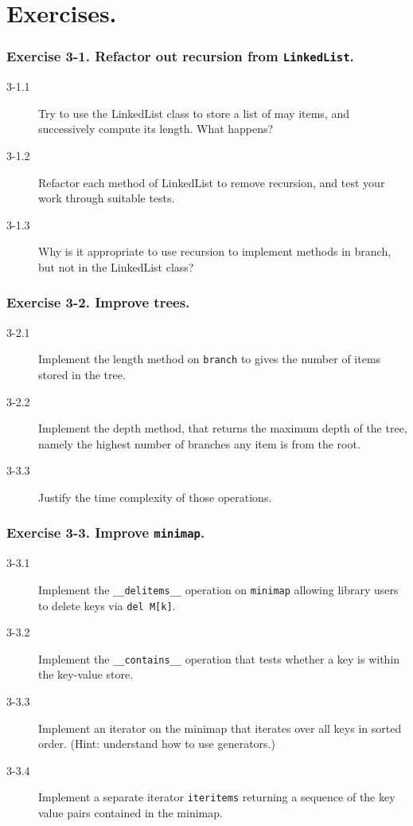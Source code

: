 \documentclass{beamer} %
\begin{document}
\section{Exercises.}

\begin{frame}

\frametitle{Exercise 3-1. Refactor out recursion from \texttt{LinkedList}.}

\begin{description}
  \item[3-1.1] Try to use the LinkedList class to store a list of may items, and successively compute its length. What happens?
  \item[3-1.2] Refactor each method of LinkedList to remove recursion, and test your work through suitable tests.
  \item[3-1.3] Why is it appropriate to use recursion to implement methods in branch, but not in the LinkedList class?
\end{description}

\end{frame}


\begin{frame}

\frametitle{Exercise 3-2. Improve trees.}

\begin{description}
  \item[3-2.1] Implement the length method on \texttt{branch} to gives the number of items stored in the tree.
  \item[3-2.2] Implement the depth method, that returns the maximum depth of the tree, namely the highest number of branches any item is from the root.
  \item[3-3.3] Justify the time complexity of those operations.
\end{description}


\end{frame}

\begin{frame}

\frametitle{Exercise 3-3. Improve \texttt{minimap}.}

\begin{description}
  \item[3-3.1] Implement the \texttt{\_\_delitems\_\_} operation on \texttt{minimap} allowing library users to delete keys via \texttt{del M[k]}.
  \item[3-3.2] Implement the \texttt{\_\_contains\_\_} operation that tests whether a key is within the key-value store.
  \item[3-3.3] Implement an iterator on the minimap that iterates over all keys in sorted order. (Hint: understand how to use generators.)
  \item[3-3.4] Implement a separate iterator \texttt{iteritems} returning a sequence of the key value pairs contained in the minimap.
\end{description}

\end{frame}
\end{document}
